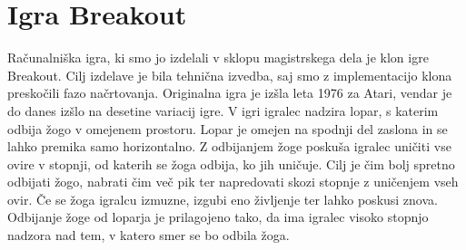 \documentclass[12pt,a4paper,twoside]{book}
\begin{document}
\section{Igra Breakout}
Računalniška igra, ki smo jo izdelali v sklopu magistrskega dela je klon igre Breakout. Cilj izdelave je bila tehnična izvedba, saj smo z implementacijo klona preskočili fazo načrtovanja. Originalna igra je izšla leta 1976 za Atari, vendar je do danes izšlo na desetine variacij igre. V igri igralec nadzira lopar, s katerim odbija žogo v omejenem prostoru. Lopar je omejen na spodnji del zaslona in se lahko premika samo horizontalno. Z odbijanjem žoge poskuša igralec uničiti vse ovire v stopnji, od katerih se žoga odbija, ko jih uničuje. Cilj je čim bolj spretno odbijati žogo, nabrati čim več pik ter napredovati skozi stopnje z uničenjem vseh ovir. Če se žoga igralcu izmuzne, izgubi eno življenje ter lahko poskusi znova. Odbijanje žoge od loparja je prilagojeno tako, da ima igralec visoko stopnjo nadzora nad tem, v katero smer se bo odbila žoga.
\end{document}
